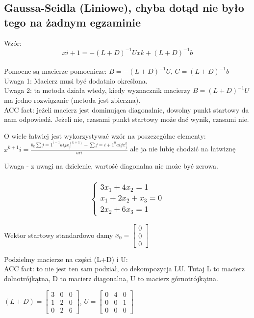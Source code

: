 \documentclass{article}
\begin{document}
\subsection{Gaussa-Seidla (Liniowe), chyba dotąd nie było tego na żadnym egzaminie}
Wzór: $$x{i+1}= - (L+D)^{-1}Ux{k} + (L+D)^{-1}b$$\\

Pomocne są macierze pomocnicze: $B = -(L+D)^{-1}U$, $C = (L+D)^{-1}b$ \\
Uwaga 1: Macierz musi być dodatnio określona. \\
Uwaga 2: ta metoda działa wtedy, kiedy wyznacznik macierzy $B = (L+D)^{-1}U$
ma jedno rozwiązanie (metoda jest zbierzna). \\ 
ACC fact: jeżeli macierz jest dominująca diagonalnie, dowolny punkt startowy 
da nam odpowiedź. Jeżeli nie, czasami punkt startowy może dać wynik, czasami nie.

O wiele łatwiej jest wykorzystywać wzór na poszczególne elementy:
$x^{k+1}{i} = \frac{b_k \sum{j=1}^{i-1}a{ij}x_j^(k+1) - \sum{j=i+1}^na{ij}x_j^k}{a{ii}} $
ale ja nie lubię chodzić na łatwiznę

Uwaga - z uwagi na dzielenie, wartość diagonalna nie może być zerowa.

\subsubsection{
\begin{equation*}\begin{cases}
    3x_1+4x_2=1\\
    x_1+2x_2+x_3=0\\
    2x_2+6x_3=1
\end{cases}\end{equation*}}
Wektor startowy standardowo damy
$x_0 = \begin{bmatrix} 0 \\ 0 \\ 0 \end{bmatrix} $

Podzielmy macierze na części (L+D) i U:\\
ACC fact: to nie jest ten sam podział, co dekompozycja LU. Tutaj L to macierz dolnotrójkątna, D to macierz diagonalna, U to macierz górnotrójkątna.

$(L+D) = \begin{bmatrix}3&0&0\\1&2&0\\0&2&6\end{bmatrix}$,
$U = \begin{bmatrix}0&4&0\\0&0&1\\0&0&0\end{bmatrix}$
\end{document}
